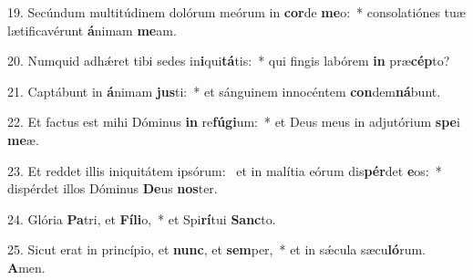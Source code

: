 19. Secúndum multitúdinem dolórum meórum in \textbf{cor}de \textbf{me}o:~*  consolatiónes tuæ lætificavérunt \textbf{á}nimam \textbf{me}am.\

20. Numquid adhǽret tibi sedes in\textbf{i}qui\textbf{tá}tis:~*  qui fingis labórem \textbf{in} præ\textbf{cép}to?\

21. Captábunt in \textbf{á}nimam \textbf{jus}ti:~*  et sánguinem innocéntem \textbf{con}dem\textbf{ná}bunt.\

22. Et factus est mihi Dóminus \textbf{in} re\textbf{fú}\textbf{gi}um:~*  et Deus meus in adjutórium \textbf{spe}i \textbf{me}æ.\

23. Et reddet illis iniquitátem ipsórum: \dag\  et in malítia eórum dis\textbf{pér}det \textbf{e}os:~*  dispérdet illos Dóminus \textbf{De}us \textbf{nos}ter.\

24. Glória \textbf{Pa}tri, et \textbf{Fí}\textbf{li}o,~*  et Spi\textbf{rí}tui \textbf{Sanc}to.\

25. Sicut erat in princípio, et \textbf{nunc}, et \textbf{sem}per,~*  et in sǽcula sæcu\textbf{ló}rum. \textbf{A}men.\

